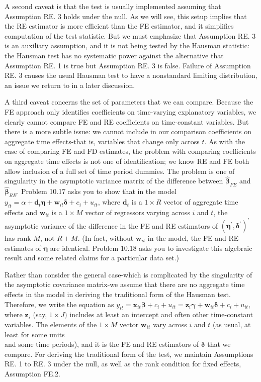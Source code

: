 \documentclass[10pt]{article}
\begin{document}
A second caveat is that the test is usually implemented assuming that Assumption RE. 3 holds under the null. As we will see, this setup implies that the RE estimator is more efficient than the FE estimator, and it simplifies computation of the test statistic. But we must emphasize that Assumption RE. 3 is an auxiliary assumption, and it is not being tested by the Hausman statistic: the Hausman test has no systematic power against the alternative that Assumption RE. 1 is true but Assumption RE. 3 is false. Failure of Assumption RE. 3 causes the usual Hausman test to have a nonstandard limiting distribution, an issue we return to in a later discussion.

A third caveat concerns the set of parameters that we can compare. Because the FE approach only identifies coefficients on time-varying explanatory variables, we clearly cannot compare FE and RE coefficients on time-constant variables. But there is a more subtle issue: we cannot include in our comparison coefficients on aggregate time effects-that is, variables that change only across $t$. As with the case of comparing FE and FD estimates, the problem with comparing coefficients on aggregate time effects is not one of identification; we know RE and FE both allow inclusion of a full set of time period dummies. The problem is one of singularity in the asymptotic variance matrix of the difference between $\hat{\boldsymbol{\beta}}_{F E}$ and $\hat{\boldsymbol{\beta}}_{R E}$. Problem 10.17 asks you to show that in the model $y_{i t}=\alpha+\mathbf{d}_{t} \boldsymbol{\eta}+\mathbf{w}_{i t} \boldsymbol{\delta}+c_{i}+u_{i t}$, where $\mathbf{d}_{t}$ is a $1 \times R$ vector of aggregate time effects and $\mathbf{w}_{i t}$ is a $1 \times M$ vector of regressors varying across $i$ and $t$, the asymptotic variance of the difference in the FE and RE estimators of $\left(\boldsymbol{\eta}^{\prime}, \boldsymbol{\delta}^{\prime}\right)^{\prime}$ has rank $M$, not $R+M$. (In fact, without $\mathbf{w}_{i t}$ in the model, the FE and RE estimates of $\boldsymbol{\eta}$ are identical. Problem 10.18 asks you to investigate this algebraic result and some related claims for a particular data set.)

Rather than consider the general case-which is complicated by the singularity of the asymptotic covariance matrix-we assume that there are no aggregate time effects in the model in deriving the traditional form of the Hausman test. Therefore, we write the equation as $y_{i t}=\mathbf{x}_{i t} \boldsymbol{\beta}+c_{i}+u_{i t}=\mathbf{z}_{i} \boldsymbol{\gamma}+\mathbf{w}_{i t} \boldsymbol{\delta}+c_{i}+u_{i t}$, where $\mathbf{z}_{i}$ (say, $1 \times J)$ includes at least an intercept and often other time-constant variables. The elements of the $1 \times M$ vector $\mathbf{w}_{i t}$ vary across $i$ and $t$ (as usual, at least for some units\\
and some time periods), and it is the FE and RE estimators of $\boldsymbol{\delta}$ that we compare. For deriving the traditional form of the test, we maintain Assumptions RE. 1 to RE. 3 under the null, as well as the rank condition for fixed effects, Assumption FE.2.
\end{document}
